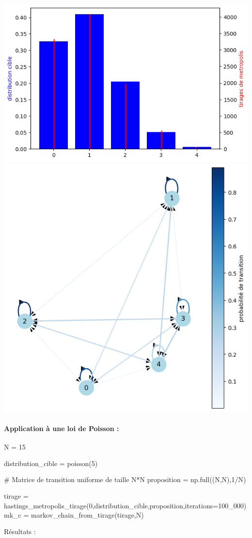 \documentclass{article}
\begin{document}
\includegraphics[scale=0.25]{loi bin.png}
\includegraphics[scale=0.25]{loi bin graph.png}

\newpage
\paragraph{Application à une loi de Poisson :}
\begin{center}
\begin{python}
N = 15

distribution_cible = poisson(5)

# Matrice de transition uniforme de taille N*N
proposition = np.full((N,N),1/N)

tirage = hastings_metropolis_tirage(0,distribution_cible,proposition,iterations=100_000)
mk_c = markov_chain_from_tirage(tirage,N)
\end{python}
\end{center}
Résultats :
\end{document}
